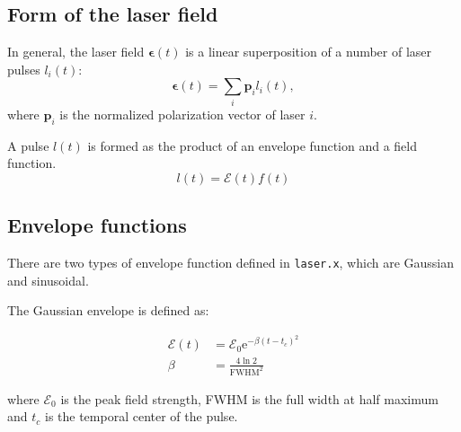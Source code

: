 \documentclass[a4paper,11pt,DIV=15,openany,twoside=false]{scrbook}
\newcommand{\tthdump}[1]{#1}
\newcommand{\ttt}[1]{\texttt{#1}}
\newcommand{\E}{\ensuremath{\mathrm{e}}}
\renewcommand{\vec}[1]{\ensuremath{\mathbf{#1}}}
\begin{document}
\subsection{Form of the laser field}

In general, the laser field $\boldsymbol{\epsilon}(t)$ is a linear superposition of a number of laser pulses $l_i(t)$:
\begin{equation}
  \boldsymbol{\epsilon}(t)=\sum\limits_i \vec{p}_il_i(t),
\end{equation}
where $\vec{p}_i$ is the normalized polarization vector of laser $i$.

A pulse $l(t)$ is formed as the product of an envelope function and a field function. 
\begin{equation}
  l(t)=\mathcal{E}(t)f(t)
\end{equation}

\subsection{Envelope functions}

There are two types of envelope function defined in \ttt{laser.x}, which are Gaussian and sinusoidal.

The Gaussian envelope is defined as:
\tthdump{
  \begin{align}
    \mathcal{E}(t)&=\mathcal{E}_0 \E^{-\beta(t-t_c)^2}\label{eq:laser_gauss_1}\\
    \beta&=\frac{4\ln 2}{\mathrm{FWHM}^2}\label{eq:laser_gauss_2}
  \end{align}
}
where $\mathcal{E}_0$ is the peak field strength, FWHM is the full width at half maximum and $t_c$ is the temporal center of the pulse.
\end{document}
